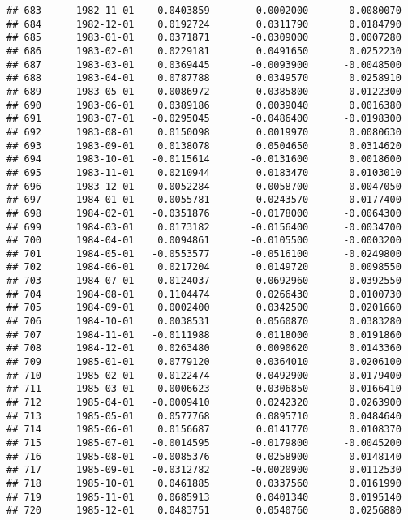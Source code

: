 \documentclass[
]{article}
\begin{document}
\begin{verbatim}
## 683      1982-11-01    0.0403859       -0.0002000       0.0080070
## 684      1982-12-01    0.0192724        0.0311790       0.0184790
## 685      1983-01-01    0.0371871       -0.0309000       0.0007280
## 686      1983-02-01    0.0229181        0.0491650       0.0252230
## 687      1983-03-01    0.0369445       -0.0093900      -0.0048500
## 688      1983-04-01    0.0787788        0.0349570       0.0258910
## 689      1983-05-01   -0.0086972       -0.0385800      -0.0122300
## 690      1983-06-01    0.0389186        0.0039040       0.0016380
## 691      1983-07-01   -0.0295045       -0.0486400      -0.0198300
## 692      1983-08-01    0.0150098        0.0019970       0.0080630
## 693      1983-09-01    0.0138078        0.0504650       0.0314620
## 694      1983-10-01   -0.0115614       -0.0131600       0.0018600
## 695      1983-11-01    0.0210944        0.0183470       0.0103010
## 696      1983-12-01   -0.0052284       -0.0058700       0.0047050
## 697      1984-01-01   -0.0055781        0.0243570       0.0177400
## 698      1984-02-01   -0.0351876       -0.0178000      -0.0064300
## 699      1984-03-01    0.0173182       -0.0156400      -0.0034700
## 700      1984-04-01    0.0094861       -0.0105500      -0.0003200
## 701      1984-05-01   -0.0553577       -0.0516100      -0.0249800
## 702      1984-06-01    0.0217204        0.0149720       0.0098550
## 703      1984-07-01   -0.0124037        0.0692960       0.0392550
## 704      1984-08-01    0.1104474        0.0266430       0.0100730
## 705      1984-09-01    0.0002400        0.0342500       0.0201660
## 706      1984-10-01    0.0038531        0.0560870       0.0383280
## 707      1984-11-01   -0.0111988        0.0118000       0.0191860
## 708      1984-12-01    0.0263480        0.0090620       0.0143360
## 709      1985-01-01    0.0779120        0.0364010       0.0206100
## 710      1985-02-01    0.0122474       -0.0492900      -0.0179400
## 711      1985-03-01    0.0006623        0.0306850       0.0166410
## 712      1985-04-01   -0.0009410        0.0242320       0.0263900
## 713      1985-05-01    0.0577768        0.0895710       0.0484640
## 714      1985-06-01    0.0156687        0.0141770       0.0108370
## 715      1985-07-01   -0.0014595       -0.0179800      -0.0045200
## 716      1985-08-01   -0.0085376        0.0258900       0.0148140
## 717      1985-09-01   -0.0312782       -0.0020900       0.0112530
## 718      1985-10-01    0.0461885        0.0337560       0.0161990
## 719      1985-11-01    0.0685913        0.0401340       0.0195140
## 720      1985-12-01    0.0483751        0.0540760       0.0256880

\end{verbatim}
\end{document}
